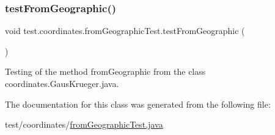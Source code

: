 \subsubsection{\texorpdfstring{test\+From\+Geographic()}{testFromGeographic()}}
{\footnotesize\ttfamily void test.\+coordinates.\+from\+Geographic\+Test.\+test\+From\+Geographic (\begin{DoxyParamCaption}{ }\end{DoxyParamCaption})}



Testing of the method from\+Geographic from the class coordinates.\+Gaus\+Krueger.\+java. 



The documentation for this class was generated from the following file\+:\begin{DoxyCompactItemize}
\item 
test/coordinates/\hyperlink{from_geographic_test_8java}{from\+Geographic\+Test.\+java}\end{DoxyCompactItemize}
